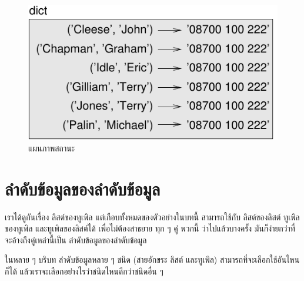 \begin{figure}
\centerline
{\includegraphics[scale=0.8]{figs/dict2.pdf}}
\caption{แผนภาพสถานะ}
\label{fig.dict2}
\end{figure}



\section{ลำดับข้อมูลของลำดับข้อมูล}

%

เราได้ดูกันเรื่อง ลิสต์ของทูเพิล
แต่เกือบทั้งหมดของตัวอย่างในบทนี้ สามารถใช้กับ ลิสต์ของลิสต์
ทูเพิลของทูเพิล และทูเพิลของลิสต์ได้
เพื่อไม่ต้องสาธยาย ทุก ๆ คู่ พวกนี้ %
ว่าไปแล้วบางครั้ง มันก็ง่ายกว่าที่จะอ้างถึงคู่เหล่านี้เป็น ลำดับข้อมูลของลำดับข้อมูล



ในหลาย ๆ บริบท ลำดับข้อมูลหลาย ๆ ชนิด (สายอักขระ ลิสต์ และทูเพิล)
สามารถที่จะเลือกใช้อันไหนก็ได้
แล้วเราจะเลือกอย่างไรว่าชนิดไหนดีกว่าชนิดอื่น ๆ
%


